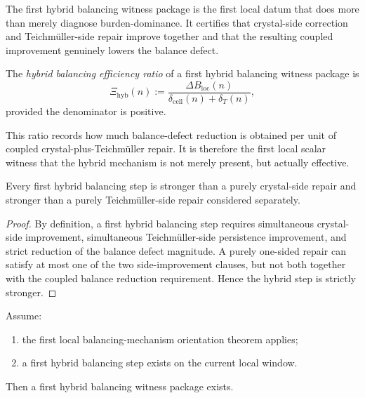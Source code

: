 \begin{remark}
\label{rem:meaning-of-the-hybrid-witness-package}
The first hybrid balancing witness package is the first local datum that does more than merely diagnose burden-dominance.
It certifies that crystal-side correction and Teichm\"uller-side repair improve together and that the resulting coupled improvement genuinely lowers the balance defect.
\end{remark}

\begin{definition}
\label{def:hybrid-balancing-efficiency-ratio}
The \emph{hybrid balancing efficiency ratio} of a first hybrid balancing witness package is
\[
  \Xi_{\mathrm{hyb}}(n)
  :=
  \frac{\Delta B_{\mathrm{loc}}(n)}{\delta_{\mathrm{cell}}(n)+\delta_{T}(n)},
\]
provided the denominator is positive.
\end{definition}

\begin{remark}
\label{rem:why-the-efficiency-ratio-is-useful}
This ratio records how much balance-defect reduction is obtained per unit of coupled crystal-plus-Teichm\"uller repair.
It is therefore the first local scalar witness that the hybrid mechanism is not merely present, but actually effective.
\end{remark}

\begin{proposition}
\label{prop:first-hybrid-balancing-step-stronger-than-separate-side-repairs}
Every first hybrid balancing step is stronger than a purely crystal-side repair and stronger than a purely Teichm\"uller-side repair considered separately.
\end{proposition}

\begin{proof}
By definition, a first hybrid balancing step requires simultaneous crystal-side improvement, simultaneous Teichm\"uller-side persistence improvement, and strict reduction of the balance defect magnitude.
A purely one-sided repair can satisfy at most one of the two side-improvement clauses, but not both together with the coupled balance reduction requirement.
Hence the hybrid step is strictly stronger.
\end{proof}

\begin{lemma}
\label{lem:first-hybrid-balancing-witness-lemma}
Assume:
\begin{enumerate}[leftmargin=2em,label=(\alph*)]
  \item the first local balancing-mechanism orientation theorem applies;
  \item a first hybrid balancing step exists on the current local window.
\end{enumerate}
Then a first hybrid balancing witness package exists.
\end{lemma}

